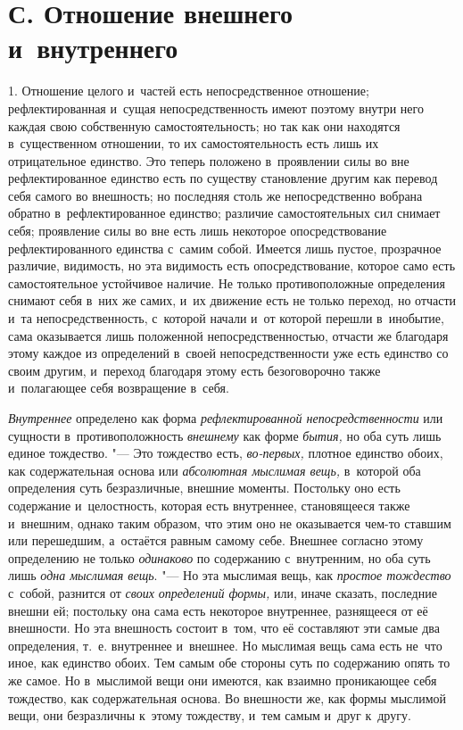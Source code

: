 \section[С. Отношение внешнего и~внутреннего]
{С. Отношение внешнего и~внутреннего}

1. Отношение целого и~частей есть
непосредственное отношение; рефлектированная и~сущая непосредственность
имеют поэтому внутри него каждая свою собственную самостоятельность; но так
как они находятся в~существенном отношении, то их самостоятельность есть
лишь их отрицательное единство. Это теперь положено в~проявлении силы во
вне рефлектированное единство есть по существу становление другим как
перевод себя самого во внешность; но последняя столь же непосредственно
вобрана обратно в~рефлектированное единство; различие самостоятельных сил
снимает себя; проявление силы во вне есть лишь некоторое опосредствование
рефлектированного единства с~самим собой. Имеется лишь пустое, прозрачное
различие, видимость, но эта видимость есть опосредствование, которое само
есть самостоятельное устойчивое наличие. Не только противоположные
определения снимают себя в~них же самих, и~их движение есть не только
переход, но отчасти и~та непосредственность, с~которой начали и~от которой
перешли в~инобытие, сама оказывается лишь положенной непосредственностью,
отчасти же благодаря этому каждое из определений в~своей непосредственности
уже есть единство со своим другим, и~переход благодаря этому есть
безоговорочно также и~полагающее себя возвращение в~себя.

{\em Внутреннее} определено как форма
{\em рефлектированной непосредственности} или сущности
в~противоположность {\em внешнему} как форме
{\em бытия,} но оба суть лишь единое тождество. "--- Это
тождество есть, {\em во-первых,} плотное единство
обоих, как содержательная основа или {\em абсолютная
мыслимая вещь,} в~которой оба определения суть безразличные, внешние
моменты. Постольку оно есть содержание и~целостность, которая есть
внутреннее, становящееся также и~внешним, однако таким образом, что этим
оно не оказывается чем-то ставшим или перешедшим, а~остаётся равным самому
себе. Внешнее согласно этому определению не только
{\em одинаково} по содержанию с~внутренним, но оба суть
лишь {\em одна мыслимая вещь}. "--- Но эта мыслимая вещь,
как {\em простое тождество} с~собой, разнится от
{\em своих определений формы,} или, иначе сказать,
последние внешни ей; постольку она сама есть некоторое внутреннее,
разнящееся от её внешности. Но эта внешность состоит в~том, что её
составляют эти самые два определения, т.~е. внутреннее и~внешнее. Но
мыслимая вещь сама есть не~что иное, как единство обоих. Тем самым обе
стороны суть по содержанию опять то же самое. Но в~мыслимой вещи они
имеются, как взаимно проникающее себя тождество, как содержательная основа.
Во внешности же, как формы мыслимой вещи, они безразличны к~этому
тождеству, и~тем самым и~друг к~другу.

